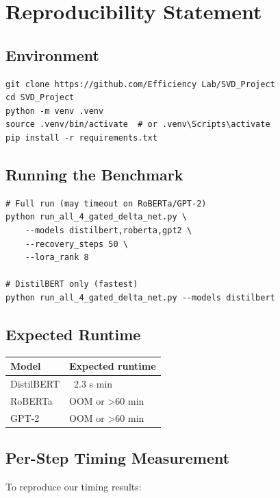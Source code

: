 
\section{Reproducibility Statement}

\subsection{Environment}

\begin{lstlisting}
git clone https://github.com/Efficiency Lab/SVD_Project
cd SVD_Project
python -m venv .venv
source .venv/bin/activate  # or .venv\Scripts\activate
pip install -r requirements.txt
\end{lstlisting}

\subsection{Running the Benchmark}

\begin{lstlisting}
# Full run (may timeout on RoBERTa/GPT-2)
python run_all_4_gated_delta_net.py \
    --models distilbert,roberta,gpt2 \
    --recovery_steps 50 \
    --lora_rank 8

# DistilBERT only (fastest)
python run_all_4_gated_delta_net.py --models distilbert
\end{lstlisting}

\subsection{Expected Runtime}

\begin{table}[H]
\centering
\small
\begin{tabular}{ll}
\toprule
\textbf{Model} & \textbf{Expected runtime} \\
\midrule
DistilBERT & ~2.3 s min \\
RoBERTa & OOM or >60 min \\
GPT-2 & OOM or >60 min \\
\bottomrule
\end{tabular}
\end{table}

\subsection{Per-Step Timing Measurement}

To reproduce our timing results:

